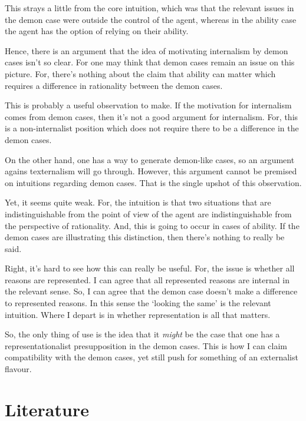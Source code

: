 \documentclass[10pt]{article}
\newcommand{\hozlinedash}[0]{%
  \noindent\hdashrule[0.5ex][c]{\textwidth}{.1pt}{2.5pt}
}
\begin{document}
This strays a little from the core intuition, which was that the relevant issues in the demon case were outside the control of the agent, whereas in the ability case the agent has the option of relying on their ability.

Hence, there is an argument that the idea of motivating internalism by demon cases isn't so clear.
For one may think that demon cases remain an issue on this picture.
For, there's nothing about the claim that ability can matter which requires a difference in rationality between the demon cases.

This is probably a useful observation to make.
If the motivation for internalism comes from demon cases, then it's not a good argument for internalism.
For, this is a non-internalist position which does not require there to be a difference in the demon cases.

On the other hand, one has a way to generate demon-like cases, so an argument agains texternalism will go through.
However, this argument cannot be premised on intuitions regarding demon cases.
That is the single upshot of this observation.

Yet, it seems quite weak.
For, the intuition is that two situations that are indistinguishable from the point of view of the agent are indistinguishable from the perspective of rationality.
And, this is going to occur in cases of ability.
If the demon cases are illustrating this distinction, then there's nothing to really be said.

Right, it's hard to see how this can really be useful.
For, the issue is whether all reasons are represented.
I can agree that all represented reasons are internal in the relevant sense.
So, I can agree that the demon case doesn't make a difference to represented reasons.
In this sense the `looking the same' is the relevant intuition.
Where I depart is in whether representation is all that matters.

So, the only thing of use is the idea that it \emph{might} be the case that one has a representationalist presupposition in the demon cases.
This is how I can claim compatibility with the demon cases, yet still push for something of an externalist flavour.

\hozlinedash


\newpage


\section{Literature}
\label{sec:literature}
\end{document}
